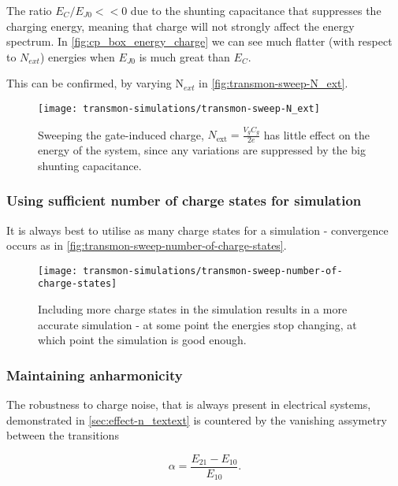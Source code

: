 The  ratio $E_{C}/E_{J0}<<0$  due  to the  shunting capacitance  that
suppresses the charging energy, meaning that charge will not strongly
affect the energy spectrum.  In \autoref{fig:cp_box_energy_charge} we
can  see  much flatter  (with  respect  to $N_{ext}$)  energies  when
$E_{J0}$ is much great than $E_C$.

This    can     be    confirmed,    by    varying     N$_{ext}$    in
\autoref{fig:transmon-sweep-N_ext}.

\begin{figure}[h]
  \centering
  \texttt{[image: transmon-simulations/transmon-sweep-N\_ext]}
  \caption{\small      Sweeping     the      gate-induced     charge,
    $N_{\text{ext}} = \frac{V_{g}C_{g}}{2e}$ has little effect on the
    energy of the system, since  any variations are suppressed by the
    big shunting capacitance. \label{fig:transmon-sweep-N_ext}}
\end{figure}

\subsubsection{Using   sufficient  number   of   charge  states   for
  simulation}
\label{sec:note-simulation}

It is always best to utilise as many charge states for a simulation -
convergence                occurs                as                in
\autoref{fig:transmon-sweep-number-of-charge-states}.

\begin{figure}[h]
  \centering
  \texttt{[image: transmon-simulations/transmon-sweep-number-of-charge-states]}
  \caption{\small  Including more  charge  states  in the  simulation
    results  in  a more  accurate  simulation  -  at some  point  the
    energies stop  changing, at  which point  the simulation  is good
    enough.\label{fig:transmon-sweep-number-of-charge-states}}
\end{figure}

\subsubsection{Maintaining anharmonicity}
\label{sec:maint-anharm}

The robustness to charge noise,  that is always present in electrical
systems, demonstrated in  \autoref{sec:effect-n_textext} is countered
by the vanishing assymetry between the transitions

\begin{equation}\label{eq:transmon-assymetry}
  \alpha = \frac{E_{21} - E_{10}}{E_{10}}.
\end{equation}

